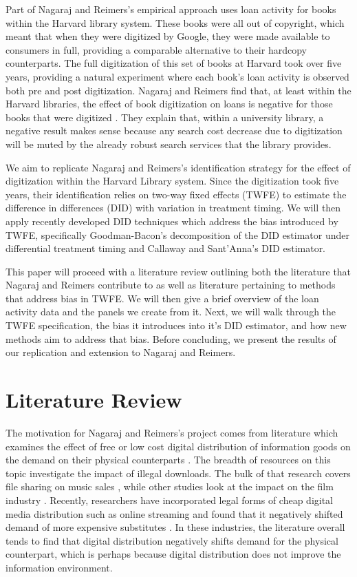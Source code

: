 \documentclass{article}
\begin{document}
Part of Nagaraj and Reimers's empirical approach uses loan activity for books within the Harvard library system. These books were all out of copyright, which meant that when they were digitized by Google, they were made available to consumers in full, providing a comparable alternative to their hardcopy counterparts. The full digitization of this set of books at Harvard took over five years, providing a natural experiment where each book's loan activity is observed both pre and post digitization. Nagaraj and Reimers find that, at least within the Harvard libraries, the effect of book digitization on loans is negative for those books that were digitized \cite{nagaraj2021digitization}. They explain that, within a university library, a negative result makes sense because any search cost decrease due to digitization will be muted by the already robust search services that the library provides. 

We aim to replicate Nagaraj and Reimers's identification strategy for the effect of digitization within the Harvard Library system. Since the digitization took five years, their identification relies on two-way fixed effects (TWFE) to estimate the difference in differences (DID) with variation in treatment timing. We will then apply recently developed DID techniques which address the bias introduced by TWFE, specifically Goodman-Bacon's decomposition of the DID estimator under differential treatment timing and Callaway and Sant'Anna's DID estimator. 

This paper will proceed with a literature review outlining both the literature that Nagaraj and Reimers contribute to as well as literature pertaining to methods that address bias in TWFE. We will then give a brief overview of the loan activity data and the panels we create from it. Next, we will walk through the TWFE specification, the bias it introduces into it's DID estimator, and how new methods aim to address that bias. Before concluding, we present the results of our replication and extension to Nagaraj and Reimers. 

\section{Literature Review}
The motivation for Nagaraj and Reimers's project comes from literature which examines the effect of free or low cost digital distribution of information goods on the demand on their physical counterparts \cite{smith2016internet}. The breadth of resources on this topic investigate the impact of illegal downloads. The bulk of that research covers file sharing on music sales \cite{bounie2006piracy}, while other studies look at the impact on the film industry \cite{rob2007piracy}. Recently, researchers have incorporated legal forms of cheap digital media distribution such as online streaming and found that it negatively shifted demand of more expensive substitutes \cite{aguiar2018streaming}. In these industries, the literature overall tends to find that digital distribution negatively shifts demand for the physical counterpart, which is perhaps because digital distribution does not improve the information environment.
\end{document}
